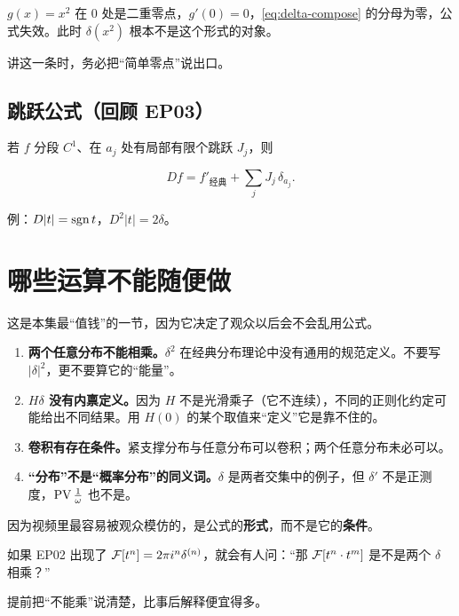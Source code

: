 \begin{warnbox}[简单零点这个条件不能省]
$g(x)=x^{2}$ 在 $0$ 处是二重零点，$g'(0)=0$，\eqref{eq:delta-compose} 的分母为零，公式失效。此时 $\delta(x^{2})$ 根本不是这个形式的对象。

讲这一条时，务必把“简单零点”说出口。
\end{warnbox}

\subsection{跳跃公式（回顾 EP03）}

若 $f$ 分段 $C^{1}$、在 $a_j$ 处有局部有限个跳跃 $J_j$，则

\begin{equation}
Df=f'_{\text{经典}}+\sum_{j}J_j\,\delta_{a_j} .
\end{equation}

例：$D|t|=\operatorname{sgn} t$，$D^{2}|t|=2\delta$。

\section{哪些运算不能随便做}

这是本集最“值钱”的一节，因为它决定了观众以后会不会乱用公式。

\begin{warnbox}[四条禁令]
\begin{enumerate}[leftmargin=1.6em,itemsep=0.4em]
\item \textbf{两个任意分布不能相乘。}$\delta^{2}$ 在经典分布理论中没有通用的规范定义。不要写 $|\delta|^{2}$，更不要算它的“能量”。
\item \textbf{$H\delta$ 没有内禀定义。}因为 $H$ 不是光滑乘子（它不连续），不同的正则化约定可能给出不同结果。用 $H(0)$ 的某个取值来“定义”它是靠不住的。
\item \textbf{卷积有存在条件。}紧支撑分布与任意分布可以卷积；两个任意分布未必可以。
\item \textbf{“分布”不是“概率分布”的同义词。}$\delta$ 是两者交集中的例子，但 $\delta'$ 不是正测度，$\operatorname{PV}\frac1\omega$ 也不是。
\end{enumerate}
\end{warnbox}

\begin{ideabox}
因为视频里最容易被观众模仿的，是公式的\textbf{形式}，而不是它的\textbf{条件}。

如果 EP02 出现了 $\mathcal{F}[t^{n}]=2\pi i^{n}\delta^{(n)}$，就会有人问：“那 $\mathcal{F}[t^{n}\cdot t^{m}]$ 是不是两个 $\delta$ 相乘？”

提前把“不能乘”说清楚，比事后解释便宜得多。
\end{ideabox}

